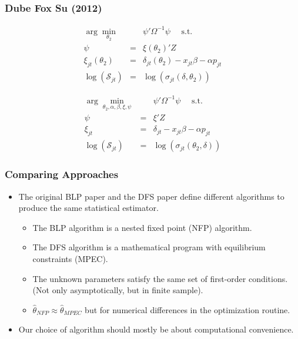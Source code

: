  \begin{frame}\frametitle{Dube Fox Su (2012)}
\footnotesize
\begin{eqnarray}
\label{blpnfxp}
\nonumber \arg \min_{\theta_2} && \psi' \Omega^{-1} \psi \quad \mbox{ s.t. } \\
\nonumber \psi &=& \xi(\theta_2)' Z\\
\xi_{jt}(\theta_2) &=& \delta_{jt}(\theta_2) - x_{jt} \beta - \alpha p_{jt} \\
\nonumber \log(\mathcal{S}_{jt})  &=& \log(\sigma_{jt}(\delta,\theta_2))
\end{eqnarray}

\begin{eqnarray}
\label{blpmpec}
\nonumber \arg \min_{\theta_2,\alpha,\beta, \xi,\psi} && \psi' \Omega^{-1}  \psi \quad \mbox{ s.t. } \\
 \psi &=& \xi' Z\\
\nonumber \xi_{jt} &=& \delta_{jt} - x_{jt} \beta - \alpha p_{jt} \\
\nonumber \log(\mathcal{S}_{jt})  &=& \log(\sigma_{jt}(\theta_2, \delta))
\end{eqnarray}
\end{frame}

\begin{frame}
\frametitle{Comparing Approaches}
\begin{itemize}
\item The original BLP paper and the DFS paper define different \alert{algorithms} to produce the same statistical \alert{estimator}.
\begin{itemize}
\item The BLP algorithm is a \alert{nested fixed point} (NFP) algorithm. 
\item The DFS algorithm is a \alert{mathematical program with equilibrium constraints} (MPEC).
\item The unknown parameters satisfy the same set of first-order conditions. (Not only asymptotically, but in finite sample).
\item $\hat{\theta}_{NFP} \approx \hat{\theta}_{MPEC}$ but for numerical differences in the optimization routine.
\end{itemize}
\item Our choice of algorithm should mostly be about computational convenience.
\end{itemize}
\end{frame}

